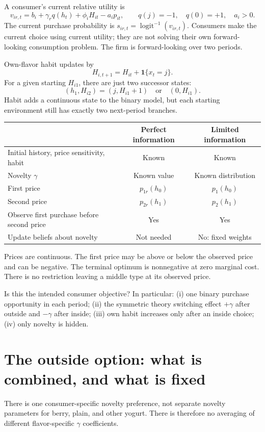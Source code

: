 \documentclass[11pt]{article}
\newcommand{\sig}{\operatorname{logit}^{-1}}
\newcommand{\ind}{\mathbf{1}}
\newcommand{\review}[1]{\begin{tcolorbox}[colback=pale,colframe=navy,title=Decision to verify]#1\end{tcolorbox}}
\begin{document}
A consumer's current relative utility is
\begin{equation}\label{eq:binary}
 v_{ir,t}=b_i+\gamma_r q(h_t)+\phi_i H_{it}-a_i p_{it},\qquad
 q(j)=-1,\quad q(0)=+1,\quad a_i>0.
\end{equation}
The current purchase probability is $s_{ir,t}=\sig(v_{ir,t})$. Consumers make the current choice using current utility; they are not solving their own forward-looking consumption problem. The firm is forward-looking over two periods.

Own-flavor habit updates by
\begin{equation}\label{eq:habit}
 H_{i,t+1}=H_{it}+\ind\{x_t=j\}.
\end{equation}
For a given starting $H_{i1}$, there are just two successor states:
\[
 (h_1,H_{i2})=(j,H_{i1}+1)\quad\text{or}\quad(0,H_{i1}).
\]
Habit adds a continuous state to the binary model, but each starting environment still has exactly two next-period branches.

\begin{center}\begin{tabular}{lcc}\toprule
 & Perfect information & Limited information\\\midrule
Initial history, price sensitivity, habit & Known & Known\\
Novelty $\gamma$ & Known value & Known distribution\\
First price & $p_{1r}(h_0)$ & $p_1(h_0)$\\
Second price & $p_{2r}(h_1)$ & $p_2(h_1)$\\
Observe first purchase before second price & Yes & Yes\\
Update beliefs about novelty & Not needed & No: fixed weights\\\bottomrule
\end{tabular}\end{center}

Prices are continuous. The first price may be above or below the observed price and can be negative. The terminal optimum is nonnegative at zero marginal cost. There is no restriction leaving a middle type at its observed price.

\review{Is this the intended consumer objective? In particular: (i) one binary purchase opportunity in each period; (ii) the symmetric theory switching effect $+\gamma$ after outside and $-\gamma$ after inside; (iii) own habit increases only after an inside choice; (iv) only novelty is hidden.}

\section{The outside option: what is combined, and what is fixed}
There is one consumer-specific novelty preference, not separate novelty parameters for berry, plain, and other yogurt. There is therefore no averaging of different flavor-specific $\gamma$ coefficients.
\end{document}
